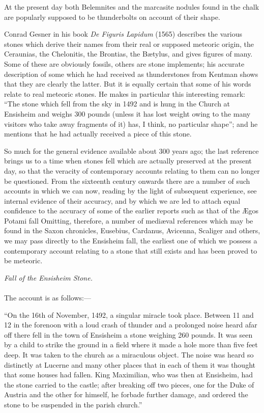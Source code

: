 \documentclass[a4paper, 12pt, oneside]{article}
\begin{document}
At the present day both Belemnites and the marcasite nodules found in the chalk are popularly supposed to be thunderbolts on account of their shape. 

Conrad Gesner in his book \emph{De Figuris Lapidum} (1565) describes the various stones which derive their names from their real or supposed meteoric origin, the Ceraunias, the Chelonitis, the Brontias, the Bætylus, and gives figures of many. Some of these are obviously fossils, others are stone implements; his accurate description of some which he had received as thunderstones from Kentman shows that they are clearly the latter. But it is equally certain that some of his words relate to real meteoric stones. He makes in particular this interesting remark: ``The stone which fell from the sky in 1492 and is hung in the Church at Ensisheim and weighs 300 pounds (unless it has lost weight owing to the many visitors who take away fragments of it) has, I think, no particular shape''; and he mentions that he had actually received a piece of this stone. 

So much for the general evidence available about 300 years ago; the last reference brings us to a time when stones fell which are actually preserved at the present day, so that the veracity of contemporary accounts relating to them can no longer be questioned. From the sixteenth century onwards there are a number of such accounts in which we can now, reading by the light of subsequent experience, see internal evidence of their accuracy, and by which we are led to attach equal confidence to the accuracy of some of the earlier reports such as that of the Ægos Potami fall Omitting, therefore, a number of mediæval references which may be found in the Saxon chronicles, Eusebius, Cardanus, Avicenna, Scaliger and others, we may pass directly to the Ensisheim fall, the earliest one of which we possess a contemporary account relating to a stone that still exists and has been proved to be meteoric. 
\begin{center}
\emph{Fall of the Ensisheim Stone.}
\end{center}
\paragraph{}
The account is as follows:--- 

``On the 16th of November, 1492, a singular miracle took place. Between 11 and 12 in the forenoon with a loud crash of thunder and a prolonged noise heard afar off there fell in the town of Ensisheim a stone weighing 260 pounds. It was seen by a child to strike the ground in a field where it made a hole more than five feet deep. It was taken to the church as a miraculous object. The noise was heard so distinctly at Lucerne and many other places that in each of them it was thought that some houses had fallen. King Maximilian, who was then at Ensisheim, had the stone carried to the castle; after breaking off two pieces, one for the Duke of Austria and the other for himself, he forbade further damage, and ordered the stone to be suspended in the parish church.'' 
\end{document}

